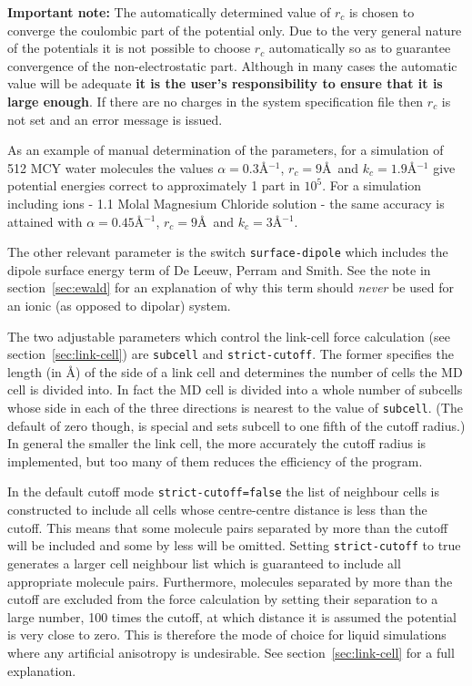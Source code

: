 \documentclass[twoside]{report}
\begin{document}
\textbf{Important note:} The automatically determined value of $r_c$
is chosen to converge the coulombic part of the potential only.  Due
to the very general nature of the potentials it is not possible to
choose $r_c$ automatically so as to guarantee convergence of the
non-electrostatic part. Although in many cases the automatic value
will be adequate \textbf{it is the user's responsibility to ensure
  that it is large enough}. If there are no charges in the system
specification file then $r_c$ is not set and an error message is
issued.

As an example of manual determination of the parameters, for a
simulation of 512 MCY water molecules the values $\alpha =
0.3$\AA$^{-1}$, $r_{c} = 9$\AA\ and $k_{c} = 1.9$\AA$^{-1}$ give
potential energies correct to approximately 1 part in $10^{5}$.  For a
simulation including ions - 1.1 Molal Magnesium Chloride solution -
the same accuracy is attained with $\alpha = 0.45$\AA$^{-1}$, $r_{c} =
9$\AA\ and $k_{c} = 3$\AA$^{-1}$.

The other relevant parameter is the switch \texttt{surface-dipole} which
includes the dipole surface energy term of De Leeuw, Perram and
Smith\cite{deleeuw:80}.  See the note in section~\ref{sec:ewald} for an
explanation of why this term should {\em never\/} be used for an ionic
(as opposed to dipolar) system.

The two adjustable parameters which control the link-cell force
calculation (see section~\ref{sec:link-cell}) are \texttt{subcell} and
\texttt{strict-cutoff}. The former specifies the length (in \AA) of the side of
a link cell and determines the number of cells the MD cell is divided
into. In fact the MD cell is divided into a whole number of subcells
whose side in each of the three directions is nearest to the value of
\texttt{subcell}.  (The default of zero though, is special and sets
subcell to one fifth of the cutoff radius.)  In general the smaller
the link cell, the more accurately the cutoff radius is implemented,
but too many of them reduces the efficiency of the program.

In the default cutoff mode \texttt{strict-cutoff=false} the list of
neighbour cells is constructed to include all cells whose
centre-centre distance is less than the cutoff.  This means that some
molecule pairs separated by more than the cutoff will be included and
some by less will be omitted.  Setting \texttt{strict-cutoff} to true
generates a larger cell neighbour list which is guaranteed to include
all appropriate molecule pairs.  Furthermore, molecules separated by
more than the cutoff are excluded from the force calculation by
setting their separation to a large number, 100 times the cutoff, at
which distance it is assumed the potential is very close to zero.
This is therefore the mode of choice for liquid simulations where any
artificial anisotropy is undesirable.  See section~\ref{sec:link-cell}
for a full explanation.
\end{document}
